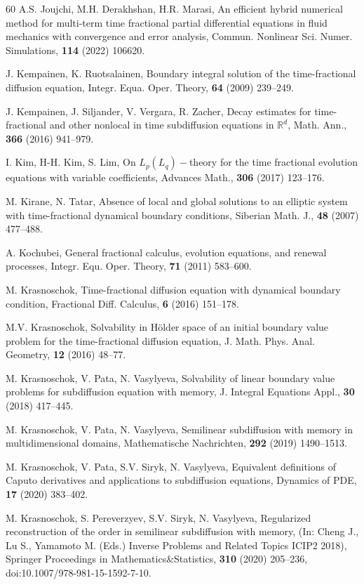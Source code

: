 \documentclass[reqno]{amsart}
\def\R {\mathbb{R}}
\theoremstyle{definition}
\numberwithin{equation}{section}
\begin{document}
\begin{thebibliography}{60}
A.S. Joujchi, M.H. Derakhshan, H.R. Marasi, An efficient hybrid numerical method for multi-term time fractional partial differential equations in fluid mechanics with convergence and error analysis, Commun. Nonlinear Sci. Numer. Simulations, \textbf{114} (2022) 106620.

J. Kempainen, K. Ruotsalainen, Boundary integral solution of the time-fractional diffusion equation, Integr. Equa. Oper. Theory, \textbf{64} (2009) 239--249.


J. Kempainen, J. Siljander, V. Vergara, R. Zacher, Decay estimates for time-fractional and other nonlocal in time subdiffusion equations in $\R^{d}$, Math. Ann., \textbf{366} (2016) 941--979.

I. Kim, H-H. Kim, S. Lim, On $L_{p}(L_{q})-$theory for the time fractional evolution equations with variable coefficients, Advances Math., \textbf{306} (2017) 123--176.

M. Kirane, N. Tatar, Absence of local and global solutions to an elliptic system with time-fractional dynamical boundary conditions, Siberian Math. J., \textbf{48} (2007) 477--488.

A. Kochubei, General fractional calculus, evolution equations, and renewal processes, Integr. Equ. Oper. Theory, \textbf{71} (2011) 583--600.

M. Krasnoschok, Time-fractional diffusion equation with dynamical boundary condition, Fractional Diff. Calculus, \textbf{6} (2016) 151--178.

M.V. Krasnoschok, Solvability in H\"{o}lder space of an initial boundary value problem for the time-fractional diffusion equation, J. Math. Phys. Anal. Geometry, \textbf{12} (2016) 48--77.

M. Krasnoschok, V. Pata, N. Vasylyeva, Solvability of
linear boundary value problems for subdiffusion equation with
memory,  J. Integral Equations  Appl., \textbf{30} (2018) 417--445.

M. Krasnoschok, V. Pata, N. Vasylyeva, Semilinear subdiffusion with memory in multidimensional domains,  Mathematische Nachrichten, \textbf{292} (2019) 1490--1513.

M. Krasnoschok, V. Pata, S.V. Siryk, N. Vasylyeva, Equivalent definitions of Caputo derivatives and applications to subdiffusion equations, Dynamics of PDE, \textbf{17} (2020) 383--402.

M. Krasnoschok, S. Pereverzyev, S.V. Siryk, N. Vasylyeva, Regularized reconstruction of the order in semilinear subdiffusion with memory, (In: Cheng J., Lu S., Yamamoto M. (Eds.) Inverse Problems and Related Topics ICIP2 2018), Springer Proceedings in Mathematics$\&$Statistics, \textbf{310} (2020) 205--236, doi:10.1007/978-981-15-1592-7-10.


\end{thebibliography}
\end{document}
